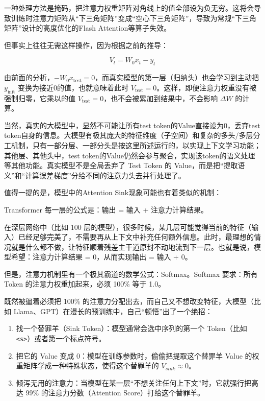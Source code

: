 一种处理方法是掩码，把注意力权重矩阵对角线上的值全部设为负无穷。这将会导致训练时注意力矩阵从``下三角矩阵''变成``空心下三角矩阵''，导致为常规``下三角矩阵''设计的高度优化的Flash Attention等算子失效。

但事实上往往无需这样操作，因为根据之前的推导：

\[
V_t = W_0 x_t - y_t
\]

由前面的分析，\(-W_0x_{\mathrm{test}}=0\)，而真实模型的第一层（归纳头）也会学习到主动把 \(y_{\mathrm{init}}\) 变换为接近0的值，也就意味着此时 \(V_{\mathrm{test}}=0\)。这样，即便注意力权重没有被强制归零，它乘以的值 \(V_{\mathrm{test}}=0\)，也不会被累加到结果中，不会影响 \(\Delta W\) 的计算。

当然，真实的大模型中，显然不可能让所有test token的Value直接设为0，丢弃test token自身的信息。大模型有极其庞大的特征维度（子空间）和复杂的多头/多层分工机制，只有一部分层、一部分头是按这里所述运行的，以实现上下文学习功能；其他层、其他头中，test token的Value仍然会参与聚合，实现该token的语义处理等其他功能。真实模型不是全局丢弃了 Test Token 的 Value，而是把``提取语义''和``计算误差梯度''分给不同的注意力头去并行处理了。

值得一提的是，模型中的Attention Sink现象可能也有着类似的机制：

Transformer 每一层的公式是：输出 = 输入 + 注意力计算结果。

在深层网络中（比如 100 层的模型），很多时候，某几层可能觉得当前的特征（输入）已经足够完美了，不需要再从上下文中补充任何额外信息。此时，最理想的情况就是什么都不做，让特征顺着残差主干道原封不动地流到下一层。也就是说，模型希望：注意力计算结果 = 0，从而实现输出 = 输入 + 0。

但是，注意力机制里有一个极其霸道的数学公式：Softmax。Softmax 要求：所有 Token 的注意力权重加起来，必须 100\% 等于 1.0。

既然被逼着必须把 100\% 的注意力分配出去，而自己又不想改变特征，大模型（比如 Llama、GPT）在漫长的预训练中，自己``顿悟''出了一个绝招：

\begin{enumerate}
\def\labelenumi{\arabic{enumi}.}
\tightlist
\item
  找一个替罪羊（Sink Token）：模型通常会选中序列的第一个 Token（比如 \texttt{\textless{}s\textgreater{}}）或者第一个标点符号。
\item
  把它的 Value 变成 0：模型在训练参数时，偷偷把提取这个替罪羊 Value 的权重矩阵学成一种特殊状态，使得这个替罪羊的 \(V_{sink} \approx 0\)。
\item
  倾泻无用的注意力：当模型在某一层``不想关注任何上下文''时，它就强行把高达 99\% 的注意力分数（Attention Score）打给这个替罪羊。
\end{enumerate}

